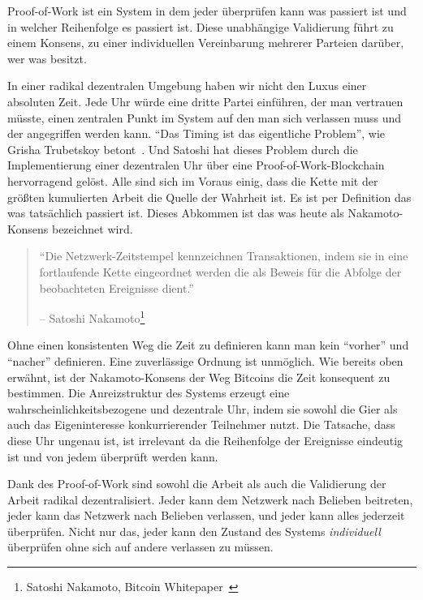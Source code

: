 Proof-of-Work ist ein System in dem jeder überprüfen kann was passiert ist und
in welcher Reihenfolge es passiert ist. Diese unabhängige Validierung führt zu
einem Konsens, zu einer individuellen Vereinbarung mehrerer Parteien darüber,
wer was besitzt.

In einer radikal dezentralen Umgebung haben wir nicht den Luxus einer absoluten
Zeit. Jede Uhr würde eine dritte Partei einführen, der man vertrauen müsste,
einen zentralen Punkt im System auf den man sich verlassen muss und der
angegriffen werden kann. \enquote{Das Timing ist das eigentliche Problem}, wie
Grisha Trubetskoy betont~\cite{pow-clock}. Und Satoshi hat dieses Problem durch
die Implementierung einer dezentralen Uhr über eine Proof-of-Work-Blockchain
hervorragend gelöst. Alle sind sich im Voraus einig, dass die Kette mit der
größten kumulierten Arbeit die Quelle der Wahrheit ist. Es ist per Definition
das was tatsächlich passiert ist. Dieses Abkommen ist das was heute als
Nakamoto-Konsens bezeichnet wird.

\begin{quotation}\begin{samepage}
\enquote{Die Netzwerk-Zeitstempel kennzeichnen Transaktionen, indem sie in eine
fortlaufende Kette eingeordnet werden die als Beweis für die Abfolge der
beobachteten Ereignisse dient.}
\begin{flushright} -- Satoshi Nakamoto\footnote{Satoshi Nakamoto, Bitcoin Whitepaper~\cite{whitepaper}}
\end{flushright}\end{samepage}\end{quotation}

Ohne einen konsistenten Weg die Zeit zu definieren kann man kein
\enquote{vorher} und \enquote{nacher} definieren. Eine zuverlässige Ordnung ist
unmöglich. Wie bereits oben erwähnt, ist der Nakamoto-Konsens der Weg Bitcoins
die Zeit konsequent zu bestimmen. Die Anreizstruktur des Systems erzeugt eine
wahrscheinlichkeitsbezogene und dezentrale Uhr, indem sie sowohl die Gier als
auch das Eigeninteresse konkurrierender Teilnehmer nutzt. Die Tatsache, dass
diese Uhr ungenau ist, ist irrelevant da die Reihenfolge der Ereignisse
eindeutig ist und von jedem überprüft werden kann.

Dank des Proof-of-Work sind sowohl die Arbeit als auch die Validierung der
Arbeit radikal dezentralisiert. Jeder kann dem Netzwerk nach Belieben beitreten,
jeder kann das Netzwerk nach Belieben verlassen, und jeder kann alles jederzeit
überprüfen. Nicht nur das, jeder kann den Zustand des Systems
\textit{individuell} überprüfen ohne sich auf andere verlassen zu müssen.

